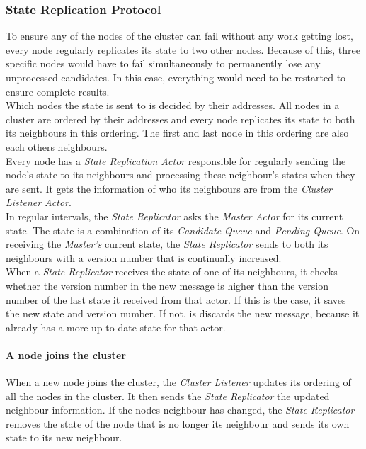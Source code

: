 \subsubsection{State Replication Protocol} \label{protocol:stateReplication}
To ensure any of the nodes of the cluster can fail without any work getting lost, every node regularly replicates its state to two other nodes.
Because of this, three specific nodes would have to fail simultaneously to permanently lose any unprocessed candidates. 
In this case, everything would need to be restarted to ensure complete results. \\
Which nodes the state is sent to is decided by their addresses.
All nodes in a cluster are ordered by their addresses and every node replicates its state to both its neighbours in this ordering.
The first and last node in this ordering are also each others neighbours.\\
Every node has a \emph{State Replication Actor} responsible for regularly sending the node's state to its neighbours and processing these neighbour's states when they are sent. 
It gets the information of who its neighbours are from the \emph{Cluster Listener Actor}. \\
In regular intervals, the \emph{State Replicator} asks the \emph{Master Actor} for its current state.
The state is a combination of its \emph{Candidate Queue} and \emph{Pending Queue}.
On receiving the \emph{Master's} current state, the \emph{State Replicator} sends to both its neighbours with a version number that is continually increased.\\
When a \emph{State Replicator} receives the state of one of its neighbours, it checks whether the version number in the new message is higher than the version number of the last state it received from that actor.
If this is the case, it saves the new state and version number.
If not, is discards the new message, because it already has a more up to date state for that actor. \\
\paragraph{A node joins the cluster}
When a new node joins the cluster, the \emph{Cluster Listener} updates its ordering of all the nodes in the cluster. 
It then sends the \emph{State Replicator} the updated neighbour information.
If the nodes neighbour has changed, the \emph{State Replicator} removes the state of the node that is no longer its neighbour and sends its own state to its new neighbour.
